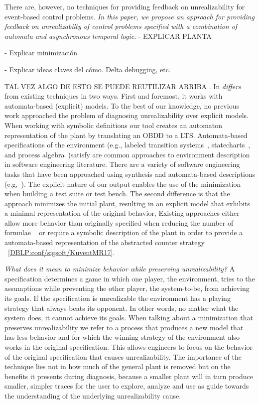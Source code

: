 There are, however, no techniques for providing feedback on unrealizability for 
event-based control problems. \emph{In this paper, we propose an approach for  
providing  feedback on unrealizabilty of control problems specified with a combination of 
automata and asynchronous temporal logic}.
- EXPLICAR PLANTA

- Explicar minimización

- Explicar ideas claves del cómo. Delta debugging, etc.





TAL VEZ ALGO DE ESTO SE PUEDE REUTILIZAR  ARRIBA
. In \textit{differs} from existing techniques in two ways. First and foremost, it works 
with automata-based (explicit) models. To the best of our knowledge, no previous work 
approached the problem of diagnosing unrealizability over explicit models.  When 
working with symbolic definitions our tool creates an automaton representation of the 
plant by translating an OBDD to a LTS. Automata-based specifications of the 
environment (e.g., labeled transition systems~\cite{Keller:1976}, 
statecharts~\cite{Harel:1987}, and process 
algebra~\cite{Milner:1982,Hoare:1983})satisfy are common approaches to 
environment description in software engineering literature. There are a variety of 
software engineering tasks that have been approached using synthesis and 
automata-based descriptions 
(e.g,~\cite{Letier:2013:RMS,DIppolito:2013,Pistore:2004:PMW}). The explicit nature 
of our output enables the use of the minimization when building a test suite or test 
bench. The second difference is that the approach minimizes the initial plant, resulting 
in an explicit model that exhibits a minimal representation of the original behavior,  
Existing approaches either allow more behavior than originally specified when reducing 
the number of formulae ~\cite{DBLP:conf/fmcad/KonighoferHB09} or require a 
symbolic description of the plant in order to provide a automata-based representation of 
the abstracted counter strategy ~\ref{DBLP:conf/sigsoft/KuventMR17}. 




\textit{What does it mean to minimize behavior while preserving unrealizability?} A 
specification determines a game in which one player, the environment, tries to  the 
assumptions while preventing the other player, the system-to-be, from achieving its 
goals. If the specification is unrealizable the environment has a playing strategy that 
always beats its opponent. In other words, no matter what the system does, it cannot 
achieve its goals. When talking about a minimization that preserves unrealizability we 
refer to a process that produces a new model that has less behavior and for which the 
winning strategy of the environment also works in the original specification. This allows 
engineers to focus on the behavior of the original specification that causes 
unrealizability. The importance of the technique lies not in how much of the general 
plant is removed but on the benefits it presents during diagnosis, because a smaller plant 
will in turn produce smaller, simpler traces for the user to explore, analyze and use as 
guide towards the understanding of the underlying unrealizability cause.



